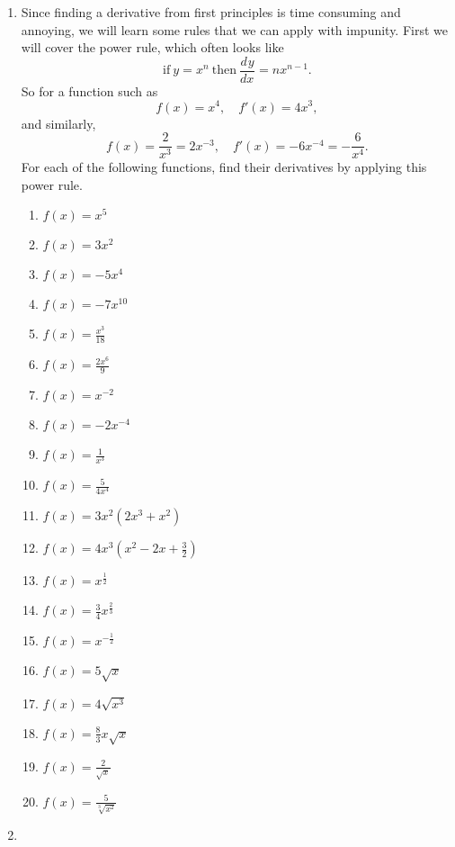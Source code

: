 \documentclass[a4paper,12pt]{article}
\newcommand{\deriv}[3][]{\frac{d^{#1}#2}{d#3^{#1}}}
\begin{document}
\begin{enumerate}
\item Since finding a derivative from first principles is time consuming and 
annoying, we will learn some rules that we can apply with impunity. First 
we will cover the power rule, which often looks like
$$\mathrm{if~} y = x^n \mathrm{~then~} \deriv{y}{x} = nx^{n - 1}.$$
So for a function such as 
$$f(x) = x^4,\quad f'(x) = 4x^3,$$
and similarly,
$$f(x) = \frac{2}{x^3} = 2x^{-3}, \quad f'(x) = -6x^{-4} = -\frac{6}{x^4}.$$
For each of the following functions, find their derivatives by applying 
this power rule.
    \begin{multicols}{2}
    \begin{enumerate}
    \item \rule[-1em]{0em}{3em}$f(x) = x^5$
    \item \rule[-1em]{0em}{3em}$f(x) = 3x^2$
    \item \rule[-1em]{0em}{3em}$f(x) = -5x^4$
    \item \rule[-1em]{0em}{3em}$f(x) = -7x^{10}$
    \item \rule[-1em]{0em}{3em}$f(x) = \frac{x^3}{18}$
    \item \rule[-1em]{0em}{3em}$f(x) = \frac{2x^6}{9}$
    \item \rule[-1em]{0em}{3em}$f(x) = x^{-2}$
    \item \rule[-1em]{0em}{3em}$f(x) = -2x^{-4}$
    \item \rule[-1em]{0em}{3em}$f(x) = \frac{1}{x^3}$
    \item \rule[-1em]{0em}{3em}$f(x) = \frac{5}{4x^4}$
    \item \rule[-1em]{0em}{3em}$f(x) = 3x^2(2x^3 + x^2)$
    \item \rule[-1em]{0em}{3em}$f(x) = 4x^3\left(x^2 - 2x + \frac{3}{2}\right)$
    \item \rule[-1em]{0em}{3em}$f(x) = x^{\frac{1}{2}}$
    \item \rule[-1em]{0em}{3em}$f(x) = \frac{3}{4}x^{\frac{2}{3}}$
    \item \rule[-1em]{0em}{3em}$f(x) = x^{-\frac{1}{2}}$
    \item \rule[-1em]{0em}{3em}$f(x) = 5\sqrt{x}$
    \item \rule[-1em]{0em}{3em}$f(x) = 4\sqrt{x^3}$
    \item \rule[-1em]{0em}{3em}$f(x) = \frac{8}{3}x\sqrt{x}$
    \item \rule[-1em]{0em}{3em}$f(x) = \frac{2}{\sqrt{x}}$
    \item \rule[-1em]{0em}{3em}$f(x) = \frac{5}{\sqrt[3]{x^2}}$
    \end{enumerate}
    \end{multicols}

\newpage
\item 
\end{enumerate}
\newpage
\end{document}
